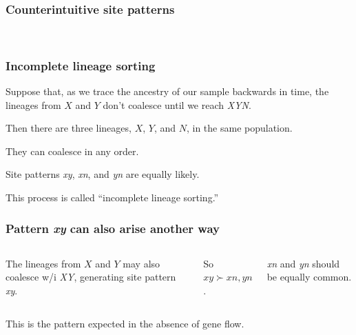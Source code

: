 \documentclass[pdftex,12pt]{beamer}
\begin{document}
\begin{frame}
  \frametitle{Counterintuitive site patterns}
  {\centering\\}  
\end{frame}

\begin{frame}
  \frametitle{Incomplete lineage sorting}
  Suppose that, as we trace the ancestry of our sample backwards in
  time, the lineages from $X$ and $Y$ don't
  coalesce until we reach \textit{XYN}.

  \bigskip

  Then there are three lineages, $X$, $Y$, and $N$, in the same
  population.

  \bigskip

  They can coalesce in any order.

  \bigskip

  Site patterns \textit{xy}, \textit{xn}, and \textit{yn} are equally
  likely.

  \bigskip

  This process is called ``incomplete lineage sorting.''
\end{frame}  

\begin{frame}
  \frametitle{Pattern \textit{xy} can also arise another way}
  \begin{columns}
    
    \raggedleft
    The lineages from $X$ and $Y$ may also coalesce w/i \textit{XY},
    generating site pattern \textit{xy}.

    \bigskip
    
    So $xy \succ xn, yn$.

    \bigskip

    \textit{xn} and \textit{yn} should be equally common.
  \end{columns}

  \bigskip\raggedleft
  
This is the pattern expected in the absence of gene flow.
\end{frame}
\end{document}

